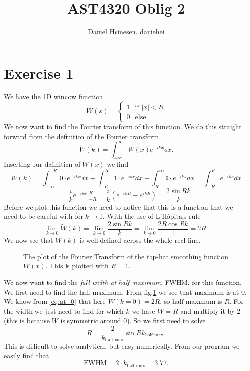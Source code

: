 \documentclass[a4paper,norsk, 10pt]{article}
\title{AST4320 Oblig 2}
\author{Daniel Heinesen, daniehei}
\begin{document}
\maketitle
\section{Exercise 1}
We have the 1D window function
\begin{equation}
W(x) =
\left\{
	\begin{array}{ll}
		1  & \mbox{if } |x| < R \\
		0 & \mbox{else } 
	\end{array}
\right.
\end{equation}
We now want to find the Fourier transform of this function. We do this straight forward from the definition of the Fourier transform
\begin{equation}
\tilde{W}(k) = \int_{-\infty}^{\infty} W(x) e^{-ikx}dx.
\end{equation}
Inserting our definition of $W(x)$ we find
\begin{equation}
\tilde{W}(k) = \int_{-\infty}^{-R}0\cdot e^{-ikx}dx + \int_{-R}^{R}1\cdot e^{-ikx}dx + \int_{R}^{\infty}0\cdot e^{-ikx}dx = \int_{-R}^{R}e^{-ikx}dx
\end{equation}
\begin{equation}
= \frac{i}{k}e^{-ikx}\bigg|_{-R}^{R} = \frac{i}{k}\left(e^{-ikR} - e^{ikR}\right) = \frac{2\sin Rk}{k}.
\end{equation}
Before we plot this function we need to notice that this is a function that we need to be careful with for $k\rightarrow 0$. With the use of L'Hôpitals rule
\begin{equation}\label{eq:at_0}
 \lim_{ k\rightarrow 0} \tilde{W}(k) = \lim_{k\rightarrow 0} \frac{2 \sin Rk}{k}
= \lim_{k\rightarrow 0} \frac{2R\cos Rk}{1} = 2R. 
 \end{equation}
We now see that $\tilde{W}(k)$ is well defined across the whole real line.

\begin{figure}[H]
\caption{The plot of the Fourier Transform of the top-hat smoothing function $W(x)$. This is plotted with $R=1$.}\label{fig:fourier}
\end{figure}

We now want to find the \textit{full width at half maximum}, FWHM, for this function. We first need to find the half maximum. From fig.\ref{fig:fourier} we see that maximum is at $0$. We know from \eqref{eq:at_0} that here $\tilde{W}(k=0) = 2R$, so half maximum is $R$. For the width we just need to find for which $k$ we have $\tilde{W} = R$ and multiply it by $2$ (this is because $\tilde{W}$ is symmetric around $0$). So we first need to solve
\begin{equation}
R = \frac{2}{k_{\text{half max}}}\sin Rk_{\text{half max}}.
\end{equation}
This is difficult to solve analytical, but easy numerically. From our program we easily find that 
\begin{equation}
\text{FWHM} = 2\cdot k_{\text{half max}} = 3.77.
\end{equation}
\end{document}
